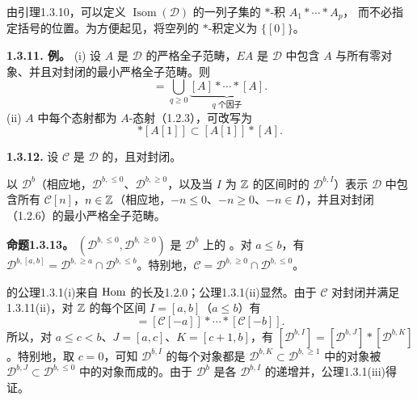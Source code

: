 由引理1.3.10，可以定义 $\operatorname{Isom}(\mathcal D)$ 的一列子集的 $*$-积 $A_1*\cdots*A_p$，
而不必指定括号的位置。为方便起见，将空列的 $*$-积定义为 $\{[0]\}$。

\par\medskip\noindent\textbf{1.3.11. 例。} (i) 设 $A$ 是 $\mathcal D$ 的严格全子范畴，$EA$ 是 $\mathcal D$ 中包含 $A$ 与所有零对象、并且对封闭的最小严格全子范畴。则
\begin{equation*}
 [EA]=\bigcup_{q\geq0}\underbrace{[A]*\cdots*[A]}_{q\text{ 个因子}}.\tag{1.3.11.1}
\end{equation*}
(ii) $A$ 中每个态射都为 $A$-态射（1.2.3），可改写为
\begin{equation*}
 [A]*[A[1]]\subset[A[1]]*[A].\tag{1.3.11.2}
\end{equation*}

\par\medskip\noindent\textbf{1.3.12.} 设 $\mathcal C$ 是 $\mathcal D$ 的，且对封闭。

以 $\mathcal D^b$（相应地，$\mathcal D^{b,\leq0}$、$\mathcal D^{b,\geq0}$，以及当 $I$ 为 $\mathbb Z$ 的区间时的 $\mathcal D^{b,I}$）表示 $\mathcal D$ 中包含所有 $\mathcal C[n]$，$n\in\mathbb Z$（相应地，$-n\leq0$、$-n\geq0$、$-n\in I$），并且对封闭（1.2.6）的最小严格全子范畴。

\par\medskip\noindent\textbf{命题1.3.13。} $(\mathcal D^{b,\leq0},\mathcal D^{b,\geq0})$ 是 $\mathcal D^b$ 上的 。对 $a\leq b$，有 $\mathcal D^{b,[a,b]}=\mathcal D^{b,\geq a}\cap\mathcal D^{b,\leq b}$。特别地，$\mathcal C=\mathcal D^{b,\geq0}\cap\mathcal D^{b,\leq0}$。

的公理1.3.1(i)来自 $\operatorname{Hom}$ 的长及1.2.0；公理1.3.1(ii)显然。由于 $\mathcal C$ 对封闭并满足1.3.11(ii)，对 $\mathbb Z$ 的每个区间 $I=[a,b]$（$a\leq b$）有
\begin{equation*}
 [\mathcal D^{b,I}]=[\mathcal C[-a]]*\cdots*[\mathcal C[-b]].\tag{1.3.13.1}
\end{equation*}
所以，对 $a\leq c<b$、$J=[a,c]$、$K=[c+1,b]$，有 $[\mathcal D^{b,I}]=[\mathcal D^{b,J}]*[\mathcal D^{b,K}]$。特别地，取 $c=0$，可知 $\mathcal D^{b,I}$ 的每个对象都是 $\mathcal D^{b,K}\subset\mathcal D^{b,\geq1}$ 中的对象被 $\mathcal D^{b,J}\subset\mathcal D^{b,\leq0}$ 中的对象而成的。由于 $\mathcal D^b$ 是各 $\mathcal D^{b,I}$ 的递增并，公理1.3.1(iii)得证。

